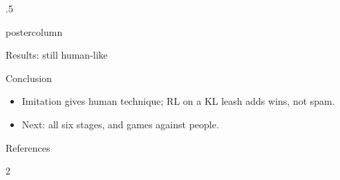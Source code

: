 \documentclass{beamer}
\begin{document}
\begin{frame}
\begin{columns}
\begin{column}{.5\textwidth}
\begin{beamercolorbox}[center]{postercolumn}
\begin{minipage}{.98\textwidth}
{\begin{myblock}{Results: still human-like}
					\end{myblock}\vfill
					\begin{myblock}{Conclusion}
						\begin{itemize}
							\item Imitation gives human technique; RL on a KL leash adds wins, not spam.
							\item Next: all six stages, and games against people.
						\end{itemize}
					\end{myblock}\vfill
					\begin{myblock}{References}
						\scriptsize
						\begin{multicols}{2}
							
							
						\end{multicols}
					\end{myblock}\vfill
		}\end{minipage}\end{beamercolorbox}
	\end{column}
\end{columns}
\end{frame}
\end{document}
